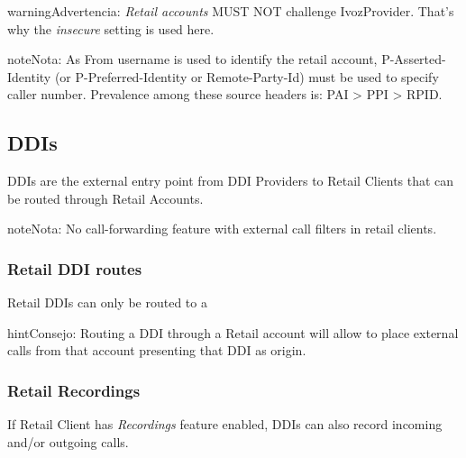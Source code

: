 \documentclass[letterpaper,10pt,spanish]{sphinxmanual}
\begin{document}
\begin{notice}{warning}{Advertencia:}
\emph{Retail accounts} MUST NOT challenge IvozProvider. That's
why the \emph{insecure} setting is used here.
\end{notice}

\begin{notice}{note}{Nota:}
As From username is used to identify the retail account, P-Asserted-Identity (or P-Preferred-Identity or Remote-Party-Id) must be used to specify caller number.
Prevalence among these source headers is: PAI \textgreater{} PPI \textgreater{} RPID.
\end{notice}


\subsection{DDIs}
\label{administration_portal/client/retail/ddis:ddis}\label{administration_portal/client/retail/ddis::doc}\label{administration_portal/client/retail/ddis:retail-ddis}
DDIs are the external entry point from DDI Providers to Retail Clients that
can be routed through Retail Accounts.

\begin{notice}{note}{Nota:}
No call-forwarding feature with external call filters in retail clients.
\end{notice}


\subsubsection{Retail DDI routes}
\label{administration_portal/client/retail/ddis:retail-ddi-routes}
Retail DDIs can only be routed to a {\hyperref[administration_portal/client/retail/retail_accounts:retail\string-accounts]{}}

\begin{notice}{hint}{Consejo:}
Routing a DDI through a Retail account will allow to place external calls
from that account presenting that DDI as origin.
\end{notice}


\subsubsection{Retail Recordings}
\label{administration_portal/client/retail/ddis:retail-recordings}
If Retail Client has \emph{Recordings} feature enabled, DDIs can also record incoming and/or
outgoing calls.
\end{document}
